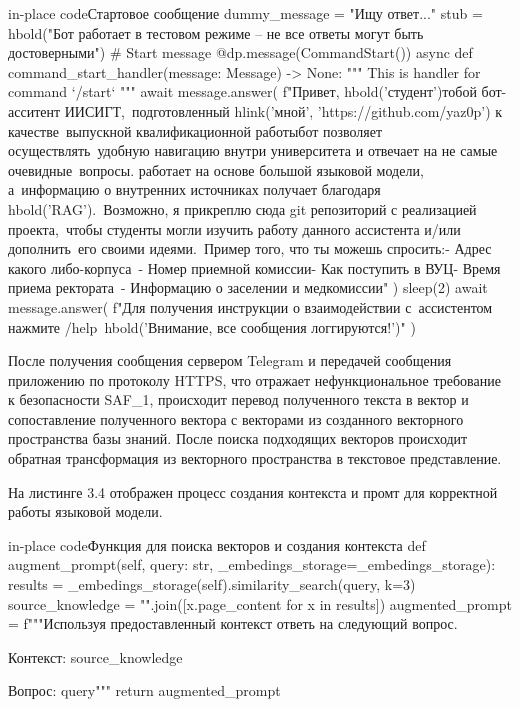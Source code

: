 \begin{codepiece}{in-place code}{Стартовое сообщение}
    dummy_message = "Ищу ответ..."
    stub = hbold("Бот работает в тестовом режиме – не все ответы могут быть достоверными")
    # Start message
    @dp.message(CommandStart())
    async def command_start_handler(message: Message) -> None:
        """
        This is handler for command `/start`
        """
        await message.answer(
            f"Привет, {hbold('студент')}\n{} тобой бот-асситент ИИСИГТ,\
     подготовленный {hlink('мной', 'https://github.com/yaz0p')} к качестве\
     выпускной квалификационной работы\n{} бот позволяет осуществлять\
     удобную навигацию внутри университета и отвечает на не самые очевидные\
     вопросы. \n{} работает на основе большой языковой модели, а\
     информацию о внутренних источниках получает благодаря {hbold('RAG')}.\
     Возможно, я прикреплю сюда git репозиторий с реализацией проекта,\
     чтобы студенты могли изучить работу данного ассистента и/или дополнить\
     его своими идеями.\n\n\
    Пример того, что ты можешь спросить:\n- Адрес какого либо-корпуса\n\
    - Номер приемной комиссии\n- Как поступить в ВУЦ\n- Время приема ректората\
     - Информацию о заселении и медкомиссии\n"
        )
        sleep(2)
        await message.answer(
            f"Для получения инструкции о взаимодействии с\
            ассистентом нажмите /help\n\n\
    {hbold('Внимание, все сообщения логгируются!')}"
        )
\end{codepiece}

После получения сообщения сервером Telegram и передачей сообщения приложению
по протоколу HTTPS, что отражает нефункциональное требование к безопасности
SAF\_1, происходит перевод полученного текста в вектор и сопоставление
полученного вектора с векторами из созданного векторного пространства 
базы знаний. После поиска подходящих векторов происходит обратная трансформация
из векторного пространства в текстовое представление. 

На листинге 3.4 отображен процесс создания контекста и промт для
корректной работы языковой модели.

\begin{codepiece}{in-place code}{Функция для поиска векторов и создания контекста}
    def augment_prompt(self, query: str, _embedings_storage=_embedings_storage):
        results = _embedings_storage(self).similarity_search(query, k=3)
        source_knowledge = "\n".join([x.page_content for x in results])
        augmented_prompt = f"""Используя предоставленный контекст ответь на следующий вопрос.

        Контекст:
        {source_knowledge}

        Вопрос: {query}"""
        return augmented_prompt
\end{codepiece}

